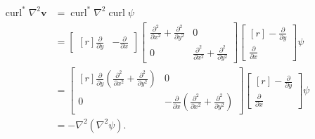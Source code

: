 \documentclass{article}
\numberwithin{equation}{section}
\begin{document}
\begin{align}\begin{split}\label{eqn:biharmonic-psi}
	\operatorname{curl}^*\nabla^2\boldsymbol{v}
	&=\operatorname{curl}^*\nabla^2\operatorname{curl}\psi\\
	&=\begin{bmatrix*}[r]
	\frac{\partial}{\partial y}&
	-\frac{\partial}{\partial x}
	\end{bmatrix*}
	\begin{bmatrix}
	\frac{\partial^2}{\partial x^2}+\frac{\partial^2}{\partial y^2} & 0\\
	0	& \frac{\partial^2}{\partial x^2}+\frac{\partial^2}{\partial y^2}
	\end{bmatrix}
	\begin{bmatrix*}[r]
	-\frac{\partial}{\partial y} \\
	\frac{\partial}{\partial x}
	\end{bmatrix*}
	\psi\\
	&=\begin{bmatrix*}[r]
	\frac{\partial}{\partial y}\left(\frac{\partial^2}{\partial x^2}+\frac{\partial^2}{\partial y^2}\right) & 0\\
	0 & -\frac{\partial}{\partial x}\left(\frac{\partial^2}{\partial x^2}+\frac{\partial^2}{\partial y^2} \right)
	\end{bmatrix*}
	\begin{bmatrix*}[r]
	-\frac{\partial}{\partial y} \\
	\frac{\partial}{\partial x}
	\end{bmatrix*}
	\psi\\
	&=-\nabla^2\left(\nabla^2\psi\right).
\end{split}\end{align}
\end{document}
